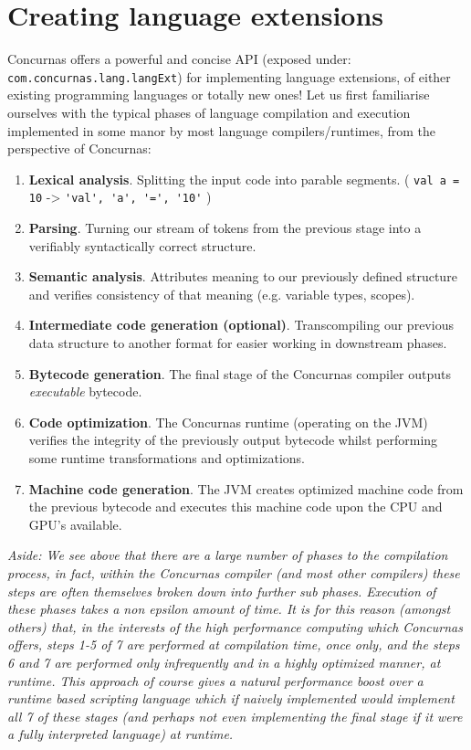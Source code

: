 \documentclass[conc-doc]{subfiles}
\begin{document}
\section{Creating language extensions}
Concurnas offers a powerful and concise API (exposed under: \lstinline{com.concurnas.lang.langExt}) for implementing language extensions, of either existing programming languages or totally new ones! Let us first familiarise ourselves with the typical phases of language compilation and execution implemented in some manor by most language compilers/runtimes, from the perspective of Concurnas:

\begin{enumerate}
	\item \textbf{Lexical analysis}. Splitting the input code into parable segments. ( \lstinline{val a = 10} -> \lstinline{'val', 'a', '=', '10'} )
	\item \textbf{Parsing}. Turning our stream of tokens from the previous stage into a verifiably syntactically correct structure.
	\item \textbf{Semantic analysis}. Attributes meaning to our previously defined structure and verifies consistency of that meaning (e.g. variable types, scopes).
	\item \textbf{Intermediate code generation (optional)}. Transcompiling our previous data structure to another format for easier working in downstream phases.
	\item \textbf{Bytecode generation}. The final stage of the Concurnas compiler outputs \textit{executable} bytecode.
	\item \textbf{Code optimization}. The Concurnas runtime (operating on the JVM) verifies the integrity of the previously output bytecode whilst performing some runtime transformations and optimizations.
	\item \textbf{Machine code generation}. The JVM creates optimized machine code from the previous bytecode and executes this machine code upon the CPU and GPU's available.
\end{enumerate}

\textit{Aside: We see above that there are a large number of phases to the compilation process, in fact, within the Concurnas compiler (and most other compilers) these steps are often themselves broken down into further sub phases. Execution of these phases takes a non epsilon amount of time. It is for this reason (amongst others) that, in the interests of the high performance computing which Concurnas offers, steps 1-5 of 7 are performed at compilation time, once only, and the steps 6 and 7 are performed only infrequently and in a highly optimized manner, at runtime. This approach of course gives a natural performance boost over a runtime based scripting language which if naively implemented would implement all 7 of these stages (and perhaps not even implementing the final stage if it were a fully interpreted language) at runtime.}
\end{document}
